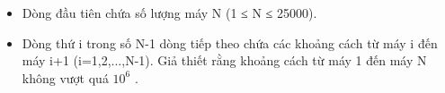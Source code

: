 \begin{itemize}
	\item     Dòng đầu tiên chứa số lượng máy N (1 ≤ N ≤ 25000).   
	\item     Dòng thứ i trong số N-1 dòng tiếp theo chứa các khoảng cách từ máy i đến máy i+1 (i=1,2,...,N-1). Giả thiết rằng khoảng cách từ máy 1 đến máy N không vượt quá $10^{6}$    .   
\end{itemize}